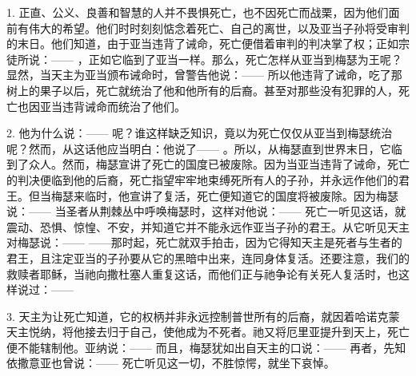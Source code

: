 1. 正直、公义、良善和智慧的人并不畏惧死亡，也不因死亡而战栗，因为他们面前有伟大的希望。他们时时刻刻惦念着死亡、自己的离世，以及亚当子孙将受审判的末日。他们知道，由于亚当违背了诫命，死亡便借着审判的判决掌了权；正如宗徒所说：—— ，正如它临到了亚当一样。那么，死亡怎样从亚当到梅瑟为王呢？显然，当天主为亚当颁布诫命时，曾警告他说：—— 所以他违背了诫命，吃了那树上的果子以后，死亡就统治了他和他所有的后裔。甚至对那些没有犯罪的人，死亡也因亚当违背诫命而统治了他们。\par

2. 他为什么说：——  呢？谁这样缺乏知识，竟以为死亡仅仅从亚当到梅瑟统治呢？然而，从这话他应当明白：他说了—— 。所以，从梅瑟直到世界末日，它临到了众人。然而，梅瑟宣讲了死亡的国度已被废除。因为当亚当违背了诫命，死亡的判决便临到他的后裔，死亡指望牢牢地束缚死所有人的子孙，并永远作他们的君王。但当梅瑟来临时，他宣讲了复活，死亡便知道它的国度将被废除。因为梅瑟说：——  当圣者从荆棘丛中呼唤梅瑟时，这样对他说：——  死亡一听见这话，就震动、恐惧、惊惶、不安，并知道它并不能永远作亚当子孙的君王。从它听见天主对梅瑟说：——  ——那时起，死亡就双手拍击，因为它得知天主是死者与生者的君王，且注定亚当的子孙要从它的黑暗中出来，连同身体复活。还要注意，我们的救赎者耶稣，当祂向撒杜塞人重复这话，而他们正与祂争论有关死人复活时，也这样说过：—— \par

3. 天主为让死亡知道，它的权柄并非永远控制普世所有的后裔，就因着哈诺克蒙天主悦纳，将他接去归于自己，使他成为不死者。祂又将厄里亚提升到天上，死亡便不能辖制他。亚纳说：——  而且，梅瑟犹如出自天主的口说：——  再者，先知依撒意亚也曾说：——  死亡听见这一切，不胜惊愕，就坐下哀悼。\par

